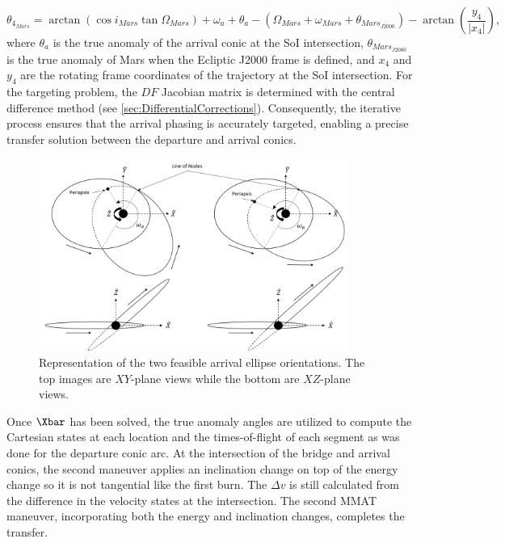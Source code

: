 \begin{equation}
    \theta_{4_{Mars}}=\arctan(\cos i_{Mars}\tan\Omega_{Mars})+\omega_{a}+\theta_{a}-(\Omega_{Mars}+\omega_{Mars}+\theta_{Mars_{J2000}})-\arctan(\frac{y_{4}}{|x_{4}|}),
    \label{eq:arrivalepoch}
\end{equation}
where $\theta_{a}$ is the true anomaly of the arrival conic at the SoI intersection,
$\theta_{Mars_{J2000}}$ is the true anomaly of Mars when the Ecliptic J2000 frame is defined, and
$x_{4}$ and $y_{4}$ are the rotating frame coordinates of the trajectory at the SoI intersection.
For the targeting problem, the $DF$ Jacobian matrix is determined with the central difference
method (see \cref{sec:DifferentialCorrections}). Consequently, the iterative process ensures that
the arrival phasing is accurately targeted, enabling a precise transfer solution between the
departure and arrival conics.

\begin{figure}[H]
    \centering
    \includegraphics[width=0.9\textwidth]{figures/orientation.jpg}
    \caption{Representation of the two feasible arrival ellipse orientations. The top images are $XY$-plane views while the bottom are $XZ$-plane views.}
    \label{fig:orientation}
\end{figure}

Once $\Xbar$ has been solved, the true anomaly angles are utilized to compute the Cartesian states
at each location and the times-of-flight of each segment as was done for the departure conic arc.
At the intersection of the bridge and arrival conics, the second maneuver applies an inclination
change on top of the energy change so it is not tangential like the first burn. The $\Delta v$ is
still calculated from the difference in the velocity states at the intersection. The second MMAT
maneuver, incorporating both the energy and inclination changes, completes the transfer.

